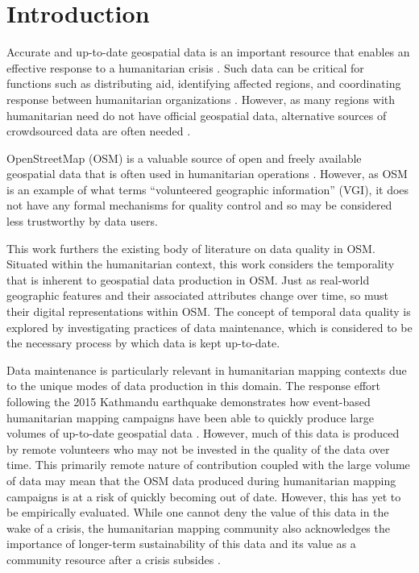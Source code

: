 \chapter{Introduction}
\label{chapterlabel1}

Accurate and up-to-date geospatial data is an important resource that enables an effective response to a humanitarian crisis \parencite{cowan_geospatial_2011, poser_volunteered_2010, soden_infrastructure_2016, zook_volunteered_2010}. Such data can be critical for functions such as distributing aid, identifying affected regions, and coordinating response between humanitarian organizations \parencite{soden_infrastructure_2016}. However, as many regions with humanitarian need do not have official geospatial data, alternative sources of crowdsourced data are often needed \parencite{zook_volunteered_2010}. 

OpenStreetMap (OSM) is a valuable source of open and freely available geospatial data that is often used in humanitarian operations \parencite{palen_success_2015, soden_infrastructure_2016}. However, as OSM is an example of what \textcite{goodchild_citizens_2007} terms “volunteered geographic information” (VGI), it does not have any formal mechanisms for quality control and so may be considered less trustworthy by data users. 

This work furthers the existing body of literature on data quality in OSM. Situated within the humanitarian context, this work considers the temporality that is inherent to geospatial data production in OSM. Just as real-world geographic features and their associated attributes change over time, so must their digital representations within OSM. The concept of temporal data quality is explored by investigating practices of data maintenance, which is considered to be the necessary process by which data is kept up-to-date. 

Data maintenance is particularly relevant in humanitarian mapping contexts due to the unique modes of data production in this domain. The response effort following the 2015 Kathmandu earthquake demonstrates how event-based humanitarian mapping campaigns have been able to quickly produce large volumes of up-to-date geospatial data \parencite{soden_infrastructure_2016}. However, much of this data is produced by remote volunteers \parencite{eckle_quality_2015} who may not be invested in the quality of the data over time. This primarily remote nature of contribution coupled with the large volume of data may mean that the OSM data produced during humanitarian mapping campaigns is at a risk of quickly becoming out of date. However, this has yet to be empirically evaluated. While one cannot deny the value of this data in the wake of a crisis, the humanitarian mapping community also acknowledges the importance of longer-term sustainability of this data and its value as a community resource after a crisis subsides \parencite{soden_crowdsourced_2014}. 

